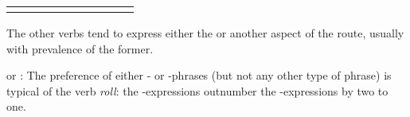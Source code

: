\documentclass[output=paper,colorlinks,citecolor=brown]{langscibook}
\begin{document}
{\begin{longtable}{l ccccccccc}
\lspbottomrule
\end{longtable}
  }



The other verbs tend to express either the  or another aspect of the route, usually with prevalence of the former.

 or : The preference of either - or -phrases (but not any other type of phrase) is typical of the verb \textit{roll}: the -expressions outnumber the -expressions by two to one. 
\end{document}
